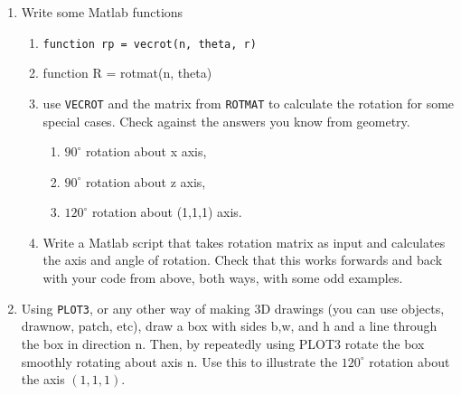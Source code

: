 \documentclass[11pt]{article}
\begin{document}
\begin{enumerate}
\begin{enumerate}[\bf  a)]
twice in sequence, to get the new positions of unit vectors that were originally
on the $x, y$ and $z$ axis, respectively. 
\item  By taking the previous results as columns of a matrix, or by operating directly on a general vector,
find the net rotation of any vector with original components $(x,y,z)$.


\end{enumerate}



\item Write some Matlab functions 
\begin{enumerate}[\bf a)]
\item {\tt function rp = vecrot(n, theta, r)}
\item  {function R = rotmat(n, theta)}
\item  use {\tt  VECROT} and the matrix from {\tt ROTMAT} to calculate the rotation for some special cases.
   Check against the answers you know from geometry.
\begin{enumerate}[\bf i)]
  \item $90^\circ$ rotation about x axis,  \item $90^\circ$ rotation about z axis,  \item $120^\circ$ rotation about (1,1,1) axis. 
  \end{enumerate}
\item Write a Matlab script that takes rotation matrix as input and calculates the axis and angle of rotation. 
Check that this works forwards and back with your code from  above, both ways, with some odd examples.

\end{enumerate}






\item Using {\tt PLOT3}, or any other way of making 3D drawings (you can use objects, drawnow,
patch, etc), 
draw a box with sides b,w, and h and a line through the box in direction n.
Then, by repeatedly using PLOT3 rotate the box smoothly rotating about axis n. Use this to illustrate 
the $120^\circ$ rotation about the axis $(1,1,1)$.



\end{enumerate}
\end{document}
